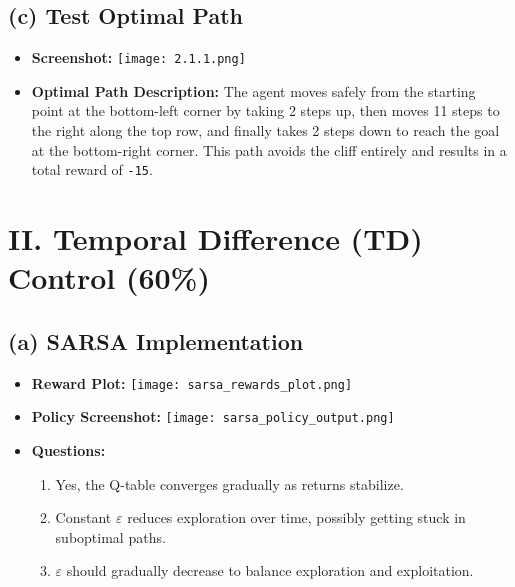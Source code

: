 \documentclass{article}
\begin{document}
\subsection*{(c) Test Optimal Path}
\begin{itemize}
    \item \textbf{Screenshot:}
    \texttt{[image: 2.1.1.png]}

    \item \textbf{Optimal Path Description:} 
    The agent moves safely from the starting point at the bottom-left corner by taking 2 steps up, then moves 11 steps to the right along the top row, and finally takes 2 steps down to reach the goal at the bottom-right corner. This path avoids the cliff entirely and results in a total reward of \texttt{-15}.
\end{itemize}

\newpage
\section*{II. Temporal Difference (TD) Control (60\%)}

\subsection*{(a) SARSA Implementation}
\begin{itemize}
    \item \textbf{Reward Plot:} 
    \texttt{[image: sarsa\_rewards\_plot.png]}

    \item \textbf{Policy Screenshot:}
    \texttt{[image: sarsa\_policy\_output.png]}

    \item \textbf{Questions:}
    \begin{enumerate}
        \item Yes, the Q-table converges gradually as returns stabilize.
        \item Constant $\varepsilon$ reduces exploration over time, possibly getting stuck in suboptimal paths.
        \item $\varepsilon$ should gradually decrease to balance exploration and exploitation.
    \end{enumerate}
\end{itemize}
\end{document}
